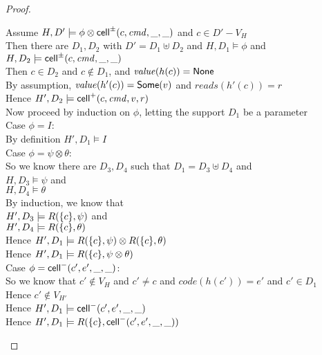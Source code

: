 \begin{proof}
  \begin{tabbedproof}
    \oo Assume $H, D' \models \phi \otimes \mathsf{cell}^{\pm}({c}, {\mathit{cmd}}, {\_}, {\_})$ and $c \in D' - V_H$ \\
    \ooo Then there are $D_1, D_2$ with $D' = D_1 \uplus D_2$ and $H, D_1 \models \phi$ and $H, D_2 \models \mathsf{cell}^{\pm}({c}, {\mathit{cmd}}, {\_}, {\_})$ \\
    \ooo Then $c \in D_2$ and $c \not \in D_1$, and $\mathit{value}(h(c)) = \mathsf{None}$ \\
    \ooo By assumption, $\mathit{value}(h'(c)) = \mathsf{Some}(v)$ and $\mathit{reads}(h'(c)) = r$ \\
    \ooo Hence $H', D_2 \models \mathsf{cell}^{+}({c}, {\mathit{cmd}}, {v}, {r})$ \\
    \ooo Now proceed by induction on $\phi$, letting the support $D_1$ be a parameter \\
    \ooo Case $\phi = I$: \\
    \oooo By definition $H', D_1 \models I$ \\
    \ooo Case $\phi = \psi \otimes \theta$: \\
    \oooo So we know there are $D_3, D_4$ such that $D_1 = D_3 \uplus D_4$ and \\
    \oooox $H, D_3 \models \psi$ and \\
    \oooox $H, D_4 \models \theta$ \\
    \oooo By induction, we know that \\
    \oooox $H', D_3 \models R(\{{c}\}, \psi)$ and \\
    \oooox $H', D_4 \models R(\{{c}\}, \theta)$ \\
    \oooo Hence $H', D_1 \models R(\{{c}\}, \psi) \otimes R(\{{c}\}, \theta)$ \\
    \oooo Hence $H', D_1 \models R(\{{c}\}, \psi \otimes \theta)$ \\

    \ooo Case $\phi = \mathsf{cell}^{-}({c'}, {e'}, {\_}, {\_})$: \\
    \oooo So we know that $c' \not\in V_H$ and $c' \not= c$ and $\mathit{code}(h(c')) = e'$ and $c' \in D_1$\\
    \oooo Hence $c' \not\in V_{H'}$ \\
    \oooo Hence $H', D_1 \models \mathsf{cell}^{-}({c'}, {e'}, {\_}, {\_})$ \\
    \oooo Hence $H', D_1 \models R(\{{c}\}, \mathsf{cell}^{-}({c'}, {e'}, {\_}, {\_}))$ \\


\end{tabbedproof}
\end{proof}
